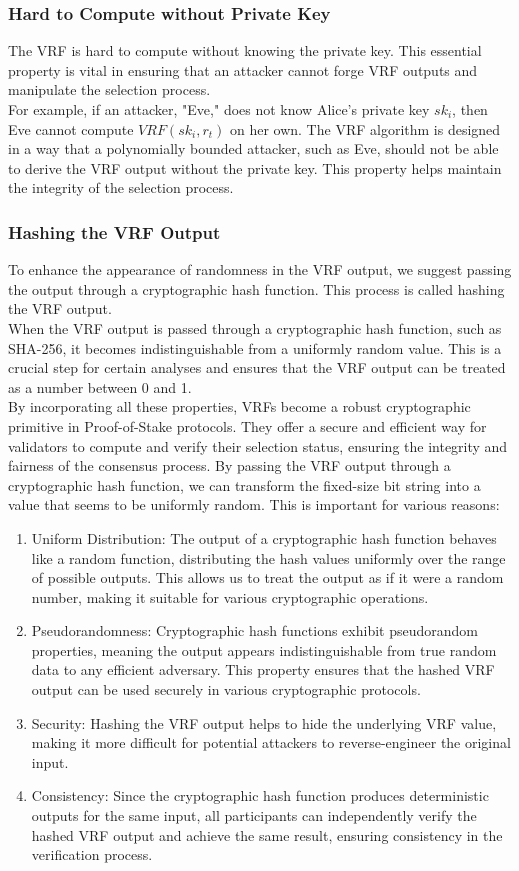\subsubsection{Hard to Compute without Private Key}
The VRF is hard to compute without knowing the private key. This essential property is vital in ensuring that an attacker cannot forge VRF outputs and manipulate the selection process.\\
For example, if an attacker, "Eve," does not know Alice's private key $sk_i$, then Eve cannot compute $VRF(sk_i, r_t)$ on her own. The VRF algorithm is designed in a way that a polynomially bounded attacker, such as Eve, should not be able to derive the VRF output without the private key. This property helps maintain the integrity of the selection process.

\subsubsection{Hashing the VRF Output}
To enhance the appearance of randomness in the VRF output, we suggest passing the output through a cryptographic hash function. This process is called hashing the VRF output.\\
When the VRF output is passed through a cryptographic hash function, such as SHA-256, it becomes indistinguishable from a uniformly random value. This is a crucial step for certain analyses and ensures that the VRF output can be treated as a number between 0 and 1.\\
By incorporating all these properties, VRFs become a robust cryptographic primitive in Proof-of-Stake protocols. They offer a secure and efficient way for validators to compute and verify their selection status, ensuring the integrity and fairness of the consensus process.
By passing the VRF output through a cryptographic hash function, we can transform the fixed-size bit string into a value that seems to be uniformly random. This is important for various reasons:
\begin{enumerate}
    \item Uniform Distribution: The output of a cryptographic hash function behaves like a random function, distributing the hash values uniformly over the range of possible outputs. This allows us to treat the output as if it were a random number, making it suitable for various cryptographic operations.
    \item Pseudorandomness: Cryptographic hash functions exhibit pseudorandom properties, meaning the output appears indistinguishable from true random data to any efficient adversary. This property ensures that the hashed VRF output can be used securely in various cryptographic protocols.
    \item Security: Hashing the VRF output helps to hide the underlying VRF value, making it more difficult for potential attackers to reverse-engineer the original input.
    \item Consistency: Since the cryptographic hash function produces deterministic outputs for the same input, all participants can independently verify the hashed VRF output and achieve the same result, ensuring consistency in the verification process.
\end{enumerate}

